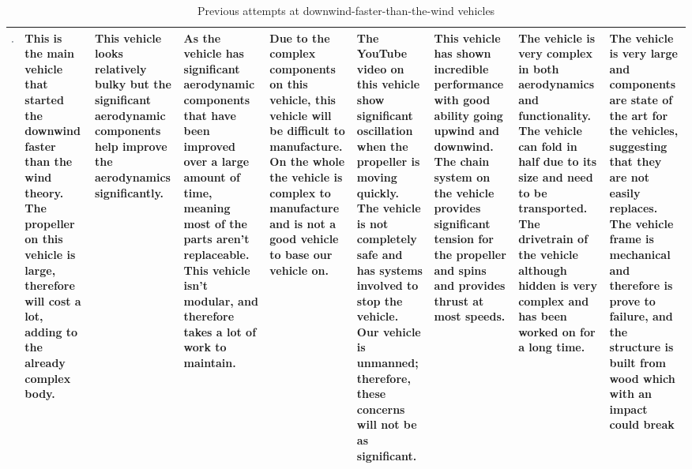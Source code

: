 \begin{table}[p]
\begin{tabular}{|m{5cm}|m{\x}|m{\x}|m{\x}|m{\x}|m{\x}|m{\x}|m{\x}|m{\x}|}
      \includegraphics[width=\linewidth]{images/placeholder.jpg}
      &  
      This is the main vehicle that started the downwind faster than the wind theory. The propeller on this vehicle is large, therefore will cost a lot, adding to the already complex body.
      &  
      This vehicle looks relatively bulky but the significant aerodynamic components help improve the aerodynamics significantly. 
      &  
      As the vehicle has significant aerodynamic components that have been improved over a large amount of time, meaning most of the parts aren't replaceable. This vehicle isn't modular, and therefore takes a lot of work to maintain.
      &  
      Due to the complex components on this vehicle, this vehicle will be difficult to manufacture. On the whole the vehicle is complex to manufacture and is not a good vehicle to base our vehicle on.
      &  
      The YouTube video on this vehicle show significant oscillation when the propeller is moving quickly. The vehicle is not completely safe and has systems involved to stop the vehicle. Our vehicle is unmanned; therefore, these concerns will not be as significant. 
      &  
      This vehicle has shown incredible performance with good ability going upwind and downwind. The chain system on the vehicle provides significant tension for the propeller and spins and provides thrust at most speeds. 
      &  
      The vehicle is very complex in both aerodynamics and functionality. The vehicle can fold in half due to its size and need to be transported. The drivetrain of the vehicle although hidden is very complex and has been worked on for a long time.
      &  
      The vehicle is very large and components are state of the art for the vehicles, suggesting that they are not easily replaces. The vehicle frame is mechanical and therefore is prove to failure, and the structure is built from wood which with an impact could break 
      \\ \hline
    \end{tabular}
    \caption{Previous attempts at downwind-faster-than-the-wind vehicles}
    \label{tab:prevAttempts}
\end{table}
\twocolumn